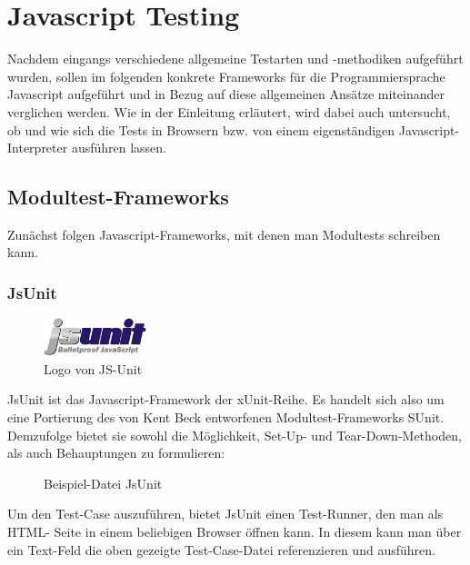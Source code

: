 \section{Javascript Testing}

Nachdem eingangs verschiedene allgemeine Testarten und -methodiken aufgeführt wurden, sollen im folgenden konkrete Frameworks für die Programmiersprache Javascript aufgeführt und in Bezug auf diese allgemeinen Ansätze miteinander verglichen werden. Wie in der Einleitung erläutert, wird dabei auch untersucht, ob und wie sich die Tests in Browsern bzw. von einem eigenständigen Javascript-Interpreter ausführen lassen.

\subsection{Modultest-Frameworks}

Zunächst folgen Javascript-Frameworks, mit denen man Modultests schreiben kann.

\subsubsection{JsUnit}

\begin{figure}[H]
	\begin{center}
		\includegraphics[width=3cm]{bilder/jsunit}
		\caption{Logo von JS-Unit}
		\label{image:jsunit}
	\end{center}
\end{figure}

JsUnit ist das Javascript-Framework der xUnit-Reihe. Es handelt sich also um eine Portierung des von Kent Beck entworfenen Modultest-Frameworks SUnit. Demzufolge bietet sie sowohl die Möglichkeit, Set-Up- und Tear-Down-Methoden, als auch Behauptungen zu formulieren:

\begin{figure}[H]
	\caption{Beispiel-Datei JsUnit}
	\label{code:jsunit}
\end{figure}

Um den Test-Case auszuführen, bietet JsUnit einen Test-Runner, den man als HTML- Seite in einem beliebigen Browser öffnen kann. In diesem kann man über ein Text-Feld die oben gezeigte Test-Case-Datei referenzieren und ausführen.


